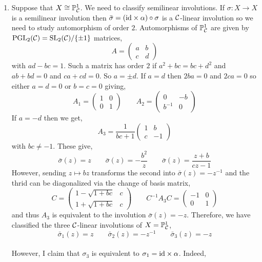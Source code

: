 \documentclass[12pt]{article}
\begin{document}
\begin{enumerate}
\item Suppose that $X \cong \mathbb{P}^1_{\mathcal{C}}$. We need to classify semilinear involutions. If $\sigma : X \to X$ is a semilinear involution then $\bar{\sigma} = (\mathrm{id} \times \alpha) \circ \sigma$ is a $\mathcal{C}$-linear involution so we need to study automorphism of order $2$. Automorphisms of $\mathbb{P}^1_{\mathcal{C}}$ are given by $\mathrm{PGL}_{2}(\mathcal{C}) = \mathrm{SL}_{2}(\mathcal{C})/\{ \pm 1 \}$ matrices,
\[ A = \begin{pmatrix}
a & b 
\\
c & d 
\end{pmatrix} \]
with $ad - bc = 1$. Such a matrix has order $2$ if $a^2 + bc = bc + d^2$ and $ab + bd = 0$ and $c a + cd = 0$. So $a = \pm d$. If $a = d$ then $2 ba = 0$ and $2 ca = 0$ so either $a = d = 0$ or $b = c = 0$ giving,
\[ 
A_1 = \begin{pmatrix}
1 & 0
\\
0 & 1 
\end{pmatrix}
\quad \quad 
A_2 = \begin{pmatrix}
0 & -b
\\
b^{-1} & 0 
\end{pmatrix} \]
If $a = -d$ then we get,
\[ A_3 = \frac{1}{bc + 1}
\begin{pmatrix}
1 & b
\\
c & -1 
\end{pmatrix}
 \]
with $bc \neq -1$. These give,
\[ \bar{\sigma}(z) = z \quad \quad \bar{\sigma}(z) = - \frac{b^2}{z} \quad \quad \bar{\sigma}(z) = \frac{z + b}{cz - 1} \]
However, sending $z \mapsto b z$ transforms the second into $\bar{\sigma}(z) = - z^{-1}$ and the thrid can be diagonalized via the change of basis matrix,
\[ C =
\begin{pmatrix}
1 - \sqrt{1 + bc} & c
\\
1 + \sqrt{1 + bc} & c
\end{pmatrix}
\quad \quad C^{-1} A_3 C = 
\begin{pmatrix}
-1 & 0
\\
0 & 1
\end{pmatrix} \]
and thus $A_3$ is equivalent to the involution $\bar{\sigma}(z) = -z$. Therefore, we have classified the three $\mathcal{C}$-linear involutions of $X = \mathbb{P}^1_{\mathcal{C}}$,
\[ \bar{\sigma}_1(z) = z \quad \quad \bar{\sigma}_2(z) = - z^{-1} \quad \quad \bar{\sigma}_3(z) = - z\]
\bigskip\\
However, I claim that $\sigma_3$ is equivalent to $\sigma_1 = \mathrm{id} \times \alpha$. Indeed,


\end{enumerate}
\end{document}
